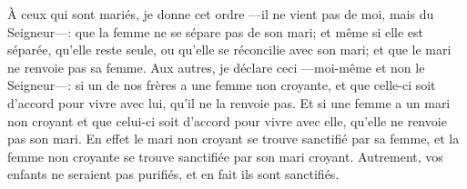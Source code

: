 À ceux qui sont mariés, je donne cet ordre
	---il ne vient pas de moi, mais du Seigneur---:
	que la femme ne se sépare pas de son mari;
	et même si elle est séparée, qu’elle reste seule,
	ou qu’elle se réconcilie avec son mari;
	et que le mari ne renvoie pas sa femme.
Aux autres, je déclare ceci ---moi-même et non le Seigneur---:
	si un de nos frères a une femme non croyante,
	et que celle-ci soit d’accord pour vivre avec lui,
	qu’il ne la renvoie pas.
Et si une femme a un mari non croyant
	et que celui-ci soit d’accord pour vivre avec elle,
	qu’elle ne renvoie pas son mari.
En effet le mari non croyant se trouve sanctifié par sa femme,
	et la femme non croyante se trouve sanctifiée par son mari croyant.
Autrement, vos enfants ne seraient pas purifiés,
	et en fait ils sont sanctifiés.
